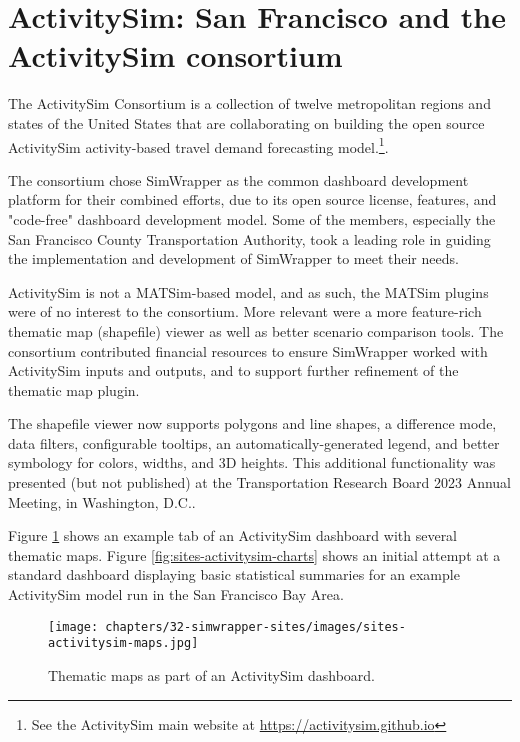 \section{ActivitySim: San Francisco and the ActivitySim consortium}
\label{sites-activitysim}

The ActivitySim Consortium is a collection of twelve metropolitan regions and states of the United States that are collaborating on building the open source ActivitySim activity-based travel demand forecasting model.\footnote{See the ActivitySim main website at \url{https://activitysim.github.io}}.

The consortium chose SimWrapper as the common dashboard development platform for their combined efforts, due to its open source license, features, and "code-free" dashboard development model. Some of the members, especially the San Francisco County Transportation Authority, took a leading role in guiding the implementation and development of SimWrapper to meet their needs.

ActivitySim is not a MATSim-based model, and as such, the MATSim plugins were of no interest to the consortium. More relevant were a more feature-rich thematic map (shapefile) viewer as well as better scenario comparison tools. The consortium contributed financial resources to ensure SimWrapper worked with ActivitySim inputs and outputs, and to support further refinement of the thematic map plugin.

The shapefile viewer now supports polygons and line shapes, a difference mode, data filters, configurable tooltips, an automatically-generated legend, and better symbology for colors, widths, and 3D heights. This additional functionality was presented (but not published) at the Transportation Research Board 2023 Annual Meeting, in Washington, D.C..

Figure \ref{fig:sites-activitysim-maps} shows an example tab of an ActivitySim dashboard with several thematic maps. Figure \ref{fig:sites-activitysim-charts} shows an initial attempt at a standard dashboard displaying basic statistical summaries for an example ActivitySim model run in the San Francisco Bay Area.

\begin{figure}[ht]
  \centering
  \texttt{[image: chapters/32-simwrapper-sites/images/sites-activitysim-maps.jpg]}
  \caption{Thematic maps as part of an ActivitySim dashboard.}
  \label{fig:sites-activitysim-maps}
\end{figure}

